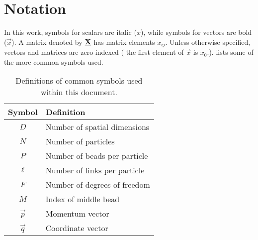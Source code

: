 \chapter{Notation}

In this work, symbols for scalars are italic ($x$), while symbols for vectors are bold ($\vec{x}$).
A matrix denoted by $\underline{\bm{\mathbf{X}}}$ has matrix elements $x_{ij}$.
Unless otherwise specified, vectors and matrices are zero-indexed (\ie{} the first element of $\vec{x}$ is $x_0$.).
 lists some of the more common symbols used.

\begin{table}[h]
	\renewcommand*\arraystretch{1.2}
	\begin{center}
	\begin{tabular}{ c l }
		\toprule
		Symbol & Definition \\
		\midrule
		$D$ & Number of spatial dimensions \\
		$N$ & Number of particles \\
		$P$ & Number of beads per particle \\
		$\ell$ & Number of links per particle \\
		$F$ & Number of degrees of freedom \\
		$M$ & Index of middle bead \\
		$\vec{p}$ & Momentum vector \\
		$\vec{q}$ & Coordinate vector \\
		\bottomrule
	\end{tabular}
	\end{center}
	\caption[
		Definitions of common symbols
	]{
		Definitions of common symbols used within this document.
	}
	\label{tab:symbols}
\end{table}

